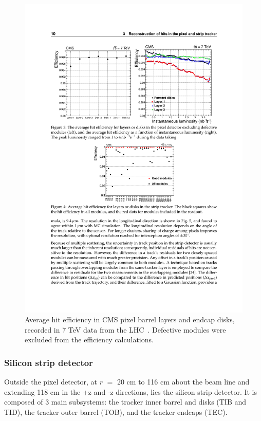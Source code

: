 \begin{figure}[hbtp]
  \begin{center}
    \includegraphics[width=1.5\cmsFigWidth]{figures/cms-pixel-performance}
    \caption{Average hit efficiency in CMS pixel barrel layers and endcap disks, recorded in 7 TeV data from the LHC~\cite{Chatrchyan:2014fea}. Defective modules were excluded from the efficiency calculations.}
    \label{fig:cms-pixel-performance}
  \end{center}
\end{figure}

\subsubsection{Silicon strip detector\label{sec:cms-strips}}

Outside the pixel detector, at $r$ $=$ 20 cm to 116 cm about the beam line and extending 118 cm in the +z and -z directions, lies the silicon strip detector. It is composed of 3 main subsystems: the tracker inner barrel and disks (TIB and TID), the tracker outer barrel (TOB), and the tracker endcaps (TEC).

